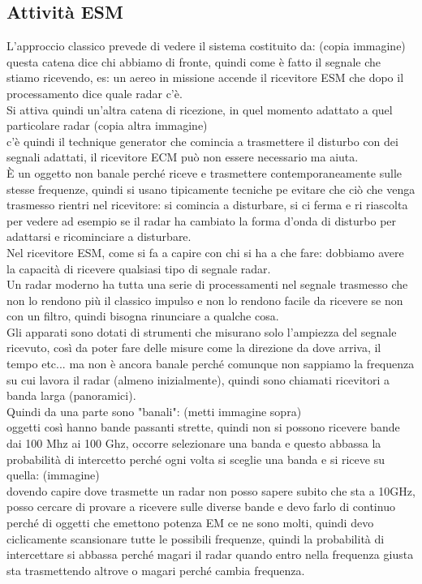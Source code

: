 \documentclass[oneside, 12pt]{extbook}
\begin{document}
\subsection{Attività ESM}
L'approccio classico prevede di vedere il sistema costituito da: (copia immagine)\\
questa catena dice chi abbiamo di fronte, quindi come è fatto il segnale che stiamo ricevendo, es: un aereo in missione accende il ricevitore ESM che dopo il processamento dice quale radar c'è.\\
Si attiva quindi un'altra catena di ricezione, in quel momento adattato a quel particolare radar (copia altra immagine)\\
c'è quindi il technique generator che comincia a trasmettere il disturbo con dei segnali adattati, il ricevitore ECM può non essere necessario ma aiuta.\\
È un oggetto non banale perché riceve e trasmettere contemporaneamente sulle stesse frequenze, quindi si usano tipicamente tecniche pe evitare che ciò che venga trasmesso rientri nel ricevitore: si comincia a disturbare, si ci ferma e ri riascolta per vedere ad esempio se il radar ha cambiato la forma d'onda di disturbo per adattarsi e ricominciare a disturbare.\\
Nel ricevitore ESM, come si fa a capire con chi si ha a che fare: dobbiamo avere la capacità di ricevere qualsiasi tipo di segnale radar.\\
Un radar moderno ha tutta una serie di processamenti nel segnale trasmesso che non lo rendono più il classico impulso e non lo rendono facile da ricevere se non con un filtro, quindi bisogna rinunciare a qualche cosa.\\
Gli apparati sono dotati di strumenti che misurano solo l'ampiezza del segnale ricevuto, così da poter fare delle misure come la direzione da dove arriva, il tempo etc... ma non è ancora banale perché comunque non sappiamo la frequenza su cui lavora il radar (almeno inizialmente), quindi sono chiamati ricevitori a banda larga (panoramici).\\
Quindi da una parte sono "banali": (metti immagine sopra)\\
oggetti così hanno bande passanti strette, quindi non si possono ricevere bande dai 100 Mhz ai 100 Ghz, occorre selezionare una banda e questo abbassa la probabilità di intercetto perché ogni volta si sceglie una banda e si riceve su quella:
(immagine)\\
dovendo capire dove trasmette un radar non posso sapere subito che sta a 10GHz, posso cercare di provare a ricevere sulle diverse bande e devo farlo di continuo perché di oggetti che emettono potenza EM ce ne sono molti, quindi devo ciclicamente scansionare tutte le possibili frequenze, quindi la probabilità di intercettare si abbassa perché magari il radar quando entro nella frequenza giusta sta trasmettendo altrove o magari perché cambia frequenza.\\
\end{document}
